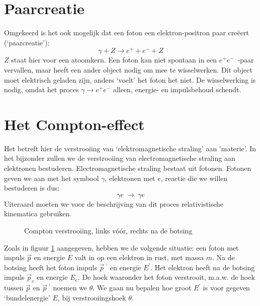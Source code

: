 \section{Paarcreatie}
Omgekeerd is het ook mogelijk dat een foton een elektron-positron paar
cre\"{e}ert (`paarcreatie'):
\begin{displaymath}
\gamma + Z \rightarrow e^{+} + e^{-} + Z
\end{displaymath}
$Z$ staat hier voor een atoomkern.
Een foton kan niet spontaan in een $e^{+}e^{-}$~-paar vervallen, maar heeft
een ander object nodig om mee te wisselwerken.
Dit object moet elektrisch geladen zijn, anders `voelt' het foton het niet.
De wisselwerking is nodig, omdat het proces $\gamma \rightarrow e^{+}e^{-}$
alleen, energie- en impulsbehoud schendt.

\section{Het Compton-effect}
Het betreft hier de verstrooiing van `elektromagnetische straling' aan 
'materie'.
In het bijzonder zullen we de verstrooiing van electromagnetische straling aan
elektronen bestuderen. Electromagnetische straling bestaat uit fotonen.
Fotonen geven we
aan met het symbool $\gamma$, elektronen met $e$, reactie die we willen 
bestuderen is dus:
\begin{displaymath}
\gamma e ~ \rightarrow ~ \gamma e
\end{displaymath}
Uiteraard moeten we voor de beschrijving van dit proces relativistische kinematica 
gebruiken.


\begin{figure}[ht]
\centering
\caption[]{Compton verstrooiing, links v\'{o}\'{o}r, rechts na de botsing }
\label{f:compton}
\end{figure}

Zoals in figuur \ref{f:compton} aangegeven, hebben we de volgende situatie:
een foton met impuls $\vec{p}$ en energie $E$ valt in op een elektron in rust, met
massa $m$. Na de botsing heeft het foton impuls $\vec{p}\ ^\prime$ en energie
$E^\prime$. Het elektron heeft na de botsing impuls $\vec{p}_e$ en energie 
$E_e$.
De hoek waaronder het foton verstrooit, m.a.w. de hoek tussen $\vec{p}$ en
$\vec{p}\ ^\prime$ noemen we $\theta$. We gaan nu bepalen hoe groot $E^\prime$
is voor gegeven `bundelenergie' $E$, bij verstrooiingshoek $\theta$.

